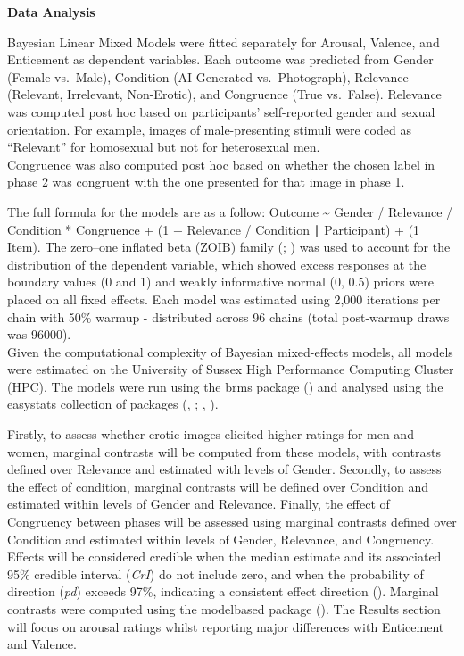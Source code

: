 \documentclass[
  jou,
  floatsintext,
  longtable,
  nolmodern,
  notxfonts,
  notimes,
  colorlinks=true,linkcolor=blue,citecolor=blue,urlcolor=blue]{apa7}
\begin{document}
\textbf{Data Analysis}

Bayesian Linear Mixed Models were fitted separately for Arousal,
Valence, and Enticement as dependent variables. Each outcome was
predicted from Gender (Female vs.~Male), Condition (AI-Generated
vs.~Photograph), Relevance (Relevant, Irrelevant, Non-Erotic), and
Congruence (True vs.~False). Relevance was computed post hoc based on
participants' self-reported gender and sexual orientation. For example,
images of male-presenting stimuli were coded as ``Relevant'' for
homosexual but not for heterosexual men.\\
Congruence was also computed post hoc based on whether the chosen label
in phase 2 was congruent with the one presented for that image in phase
1.

The full formula for the models are as a follow: Outcome
\textasciitilde{} Gender / Relevance / Condition * Congruence + (1 +
Relevance / Condition ∣ Participant) + (1 \textbar{} Item). The
zero--one inflated beta (ZOIB) family
(;
) was used to account for
the distribution of the dependent variable, which showed excess
responses at the boundary values (0 and 1) and weakly informative normal
(0, 0.5) priors were placed on all fixed effects. Each model was
estimated using 2,000 iterations per chain with 50\% warmup -
distributed across 96 chains (total post-warmup draws was 96000).\\
Given the computational complexity of Bayesian mixed-effects models, all
models were estimated on the University of Sussex High Performance
Computing Cluster (HPC). The models were run using the brms package
() and analysed using the
easystats collection of packages
(,
;
, ).

Firstly, to assess whether erotic images elicited higher ratings for men
and women, marginal contrasts will be computed from these models, with
contrasts defined over Relevance and estimated with levels of Gender.
Secondly, to assess the effect of condition, marginal contrasts will be
defined over Condition and estimated within levels of Gender and
Relevance. Finally, the effect of Congruency between phases will be
assessed using marginal contrasts defined over Condition and estimated
within levels of Gender, Relevance, and Congruency. Effects will be
considered credible when the median estimate and its associated 95\%
credible interval (\emph{CrI}) do not include zero, and when the
probability of direction (\emph{pd}) exceeds 97\%, indicating a
consistent effect direction
(). Marginal contrasts were computed using the modelbased package
(). The Results section will focus on arousal ratings whilst
reporting major differences with Enticement and Valence.
\end{document}
